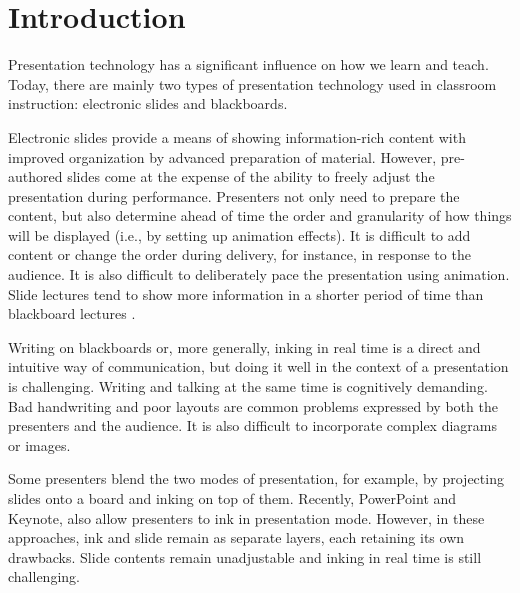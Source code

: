 \section{Introduction}

Presentation technology has a significant influence on how we learn and teach. 
Today, there are mainly two types of presentation technology used in classroom instruction: electronic slides and blackboards. 

Electronic slides provide a means of showing information-rich content with improved organization by advanced preparation of material. However, pre-authored slides come at the expense of the ability to freely adjust the presentation during performance. Presenters not only need to prepare the content, but also determine ahead of time the order and granularity of how things will be displayed (i.e., by setting up animation effects). It is difficult to add content or change the order during delivery, for instance, in response to the audience. It is also difficult to deliberately pace the presentation using animation. Slide lectures tend to show more information in a shorter period of time than blackboard lectures \cite{lanir2008observing}.

Writing on blackboards or, more generally, inking in real time is a direct and intuitive way of communication, but doing it well in the context of a presentation is challenging. Writing and talking at the same time is cognitively demanding. Bad handwriting and poor layouts are common problems expressed by both the presenters and the audience. It is also difficult to incorporate complex diagrams or images.

Some presenters blend the two modes of presentation, for example, by projecting slides onto a board and inking on top of them. Recently, PowerPoint and Keynote, also allow presenters to ink in presentation mode. However, in these approaches, ink and slide remain as separate layers, each retaining its own drawbacks. Slide contents remain unadjustable and inking in real time is still challenging.  

